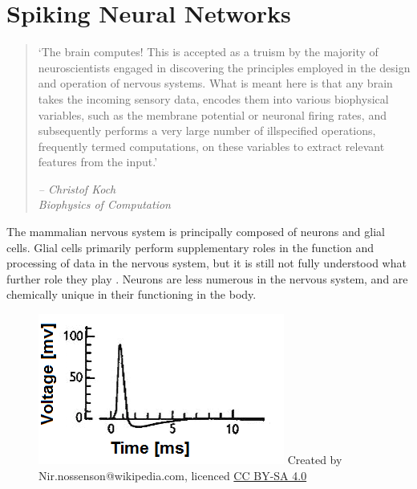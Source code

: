 \section{Spiking Neural Networks}

\begin{quote}
    `The brain computes! This is accepted as a truism by the majority
    of neuroscientists engaged in discovering the principles employed in the
    design and operation of nervous systems. What is meant here is that any
    brain takes the incoming sensory data, encodes them into various biophysical
    variables, such as the membrane potential or neuronal firing rates, and
    subsequently performs a very large number of illspecified operations,
    frequently termed computations, on these variables to extract relevant
    features from the input.'
    \begin{flushright}
        \textit{-- Christof Koch \\ Biophysics of Computation}
    \end{flushright}
\end{quote}

The mammalian nervous system is principally composed of neurons and glial cells.
Glial cells primarily perform supplementary roles in the function and processing
of data in the nervous system, but it is still not fully understood what further
role they play \autocite{walz_role_1989}. Neurons are less numerous in the
nervous system, and are chemically unique in their functioning in the body.

\begin{figure}[h]
    \centering
    \includegraphics{figures/graphs/huxhog_spike.png}
    {\small{Created by Nir.nossenson@wikipedia.com, licenced 
            \href{https://creativecommons.org/licenses/by-sa/4.0/deed.en}{CC BY-SA 4.0}}}
    \label{neuronalactionpotentialexample}
\end{figure}
\vspace{1ex}

